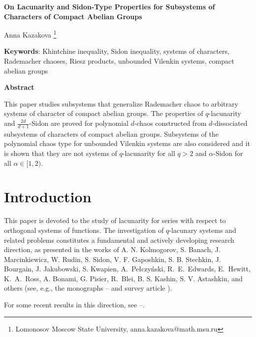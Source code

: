 \documentclass[12pt]{article}
\begin{document}
 
	\begin{center}
    \LARGE \textbf{On Lacunarity and Sidon-Type Properties for Subsystems of Characters of Compact Abelian Groups}
\end{center}

\begin{center} \Large
Anna Kazakova \footnote{Lomonosov Moscow State University, anna.kazakova@math.msu.ru}
\end{center}

\textbf{Keywords}: Khintchine inequality, Sidon inequality, systems of characters, Rademacher chaoses, Riesz products, unbounded Vilenkin systems, compact abelian groups

\begin{center} \textbf{Abstract}
\end{center}
\begin{center}
This paper studies subsystems that generalize Rademacher chaos to arbitrary systems of character of compact abelian groups. The properties of $q$-lacunarity and $\frac{2d}{d+1}$-Sidon are proved for polynomial $d$-chaos constructed from $d$-dissociated subsystems of characters of compact abelian groups. Subsystems of the polynomial chaos type for unbounded Vilenkin systems are also considered and it is shown that they are not systems of $q$-lacunarity for all $q>2$ and $\alpha$-Sidon for all $\alpha\in [1, 2)$.
\end{center}

\section*{Introduction}
	This paper is devoted to the study of lacunarity for series with respect to orthogonal systems of functions. The investigation of $q$-lacunary systems and related problems constitutes a fundamental and actively developing research direction, as presented in the works of A. N. Kolmogorov, S. Banach, J. Marcinkiewicz, W. Rudin, S. Sidon, V. F. Gaposhkin, S. B. Stechkin, J. Bourgain,  J. Jakubowski, S. Kwapien, A.~Pełczyński, R.~E.~Edwards, E.~Hewitt, K.~A.~Ross, A. Bonami, G. Pisier, R.~Blei, B. S. Kashin, S. V. Astashkin,  and others (see, e.g., the monographs \cite{Kashin-Saakyan-1999}--\cite{Blei} and survey article \cite{Gaposhkin}). 
	
	For some recent results in this direction, see \cite{Ast-2024}--\cite{Kaz26}.
	
\end{document}
